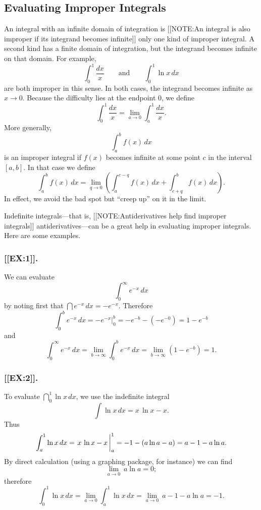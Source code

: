 \subsection{Evaluating Improper Integrals}
\label{subsec:evaluating-improper-integrals}

An integral with an infinite domain of integration is 
[[NOTE:An integral is also improper if its integrand becomes infinite]]	
only one kind of improper integral.  A second kind has a finite domain
of integration, but the integrand becomes infinite on
that domain.  For example,
	\[
\int_0^1 \dfrac{dx}{x} \qquad \mbox{and} \qquad
		\int_0^1 \ln{x} \, dx
\]
are both improper in this sense.  In both cases, the integrand becomes
infinite as $x \to 0$.  Because the difficulty lies at the endpoint 0,
we define
	\[
\int_0^1 \dfrac{dx}{x} = 
		\lim_{a \to 0} \int_a^1 \dfrac{dx}{x}.
\]
More generally, 
	\[
\int_a^b f(x) \, dx
\]
is an improper integral if $f(x)$ becomes infinite at some point $c$
in the interval $[a, b]$.  In that case we define
	\[
\int_a^b f(x) \, dx = \lim_{q \to 0} 
		\left(\int_a^{c-q} f(x) \, dx + 
			\int_{c+q}^b f(x) \, dx\right).
\]
In effect, we avoid the bad spot but ``creep up'' on it in the limit.

Indefinite integrals---that is, 
[[NOTE:Antiderivatives help find improper integrals]]	
antiderivatives---can be a great help in
evaluating improper integrals.  Here are some examples.



\subsubsection{[[EX:1]].}
We can evaluate 
	\[
\int_0^{\infty} e^{-x} \, dx
\]
by noting first that $\dint e^{-x} \, dx = - e^{-x}$.  Therefore
	\[
\int_0^b e^{-x} \, dx = \left. - e^{-x} \right|_0^b =
		-e^{-b} - \left(-e^{-0}\right) = 1 - e^{-b}
\]
and
	\[
\int_0^{\infty} e^{-x} \, dx = 
		\lim_{b \to \infty} \int_0^b e^{-x} \, dx = 
		\lim_{b \to \infty} \left(1-e^{-b}\right) = 1.
\]





\subsubsection{[[EX:2]].}
To evaluate $\dint_0^1 \ln{x} \, dx$, we use the
indefinite integral
	\[
\int \ln{x} \, dx = x\, \ln{x} - x.
\]
Thus
	\[
\int_a^1 \ln{x} \, dx = 
		\left. x\,\ln{x} - x
			\rule{0pt}{14pt}\,\right|_a^1 = 
		-1 - \left( a\ln{a} - a \right) = 
		a-1 - a\ln{a}.
\]
By direct calculation (using a graphing package, for instance) we can find 
	\[
\lim_{a \to 0} \ a\ln{a} = 0;
\]
therefore
\[
\int_0^1 \ln{x} \, dx 
  = \lim_{a \to 0} \int_a^1 \ln{x} \, dx
  = \lim_{a \to 0} \ a-1 - a\ln{a}
  = -1.
\]

